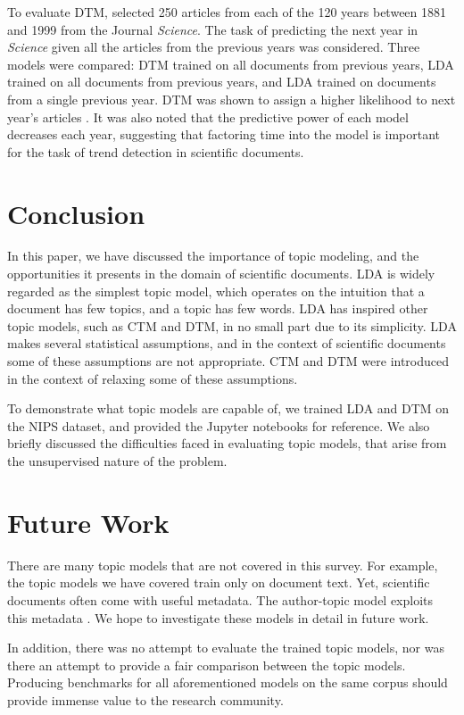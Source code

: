 \documentclass[letterpaper]{article}
\begin{document}
To evaluate DTM, \citeauthor{blei2006dynamic} selected 250 articles
from each of the 120 years between 1881 and 1999 from the Journal
\textit{Science}. The task of predicting the next year in
\textit{Science} given all the articles from the previous years was
considered. Three models were compared: DTM trained on all documents
from previous years, LDA trained on all documents from previous years,
and LDA trained on documents from a single previous year. DTM was
shown to assign a higher likelihood to next year's articles
\cite{blei2006dynamic}. It was also noted that the predictive power of
each model decreases each year, suggesting that factoring time into
the model is important for the task of trend detection in scientific
documents.

\section{Conclusion}
In this paper, we have discussed the importance of topic modeling, and
the opportunities it presents in the domain of scientific documents.
LDA is widely regarded as the simplest topic model, which operates on
the intuition that a document has few topics, and a topic has few
words. LDA has inspired other topic models, such as CTM and DTM, in no
small part due to its simplicity. LDA makes several statistical
assumptions, and in the context of scientific documents some of these
assumptions are not appropriate. CTM and DTM were introduced in
the context of relaxing some of these assumptions.

To demonstrate what topic models are capable of, we trained LDA and
DTM on the NIPS dataset, and provided the Jupyter notebooks for
reference. We also briefly discussed the difficulties faced in
evaluating topic models, that arise from the unsupervised nature of
the problem.

\section{Future Work}
There are many topic models that are not covered in this survey. For
example, the topic models we have covered train only on document text.
Yet, scientific documents often come with useful metadata. The
author-topic model exploits this metadata \cite{rosen2004author}. We
hope to investigate these models in detail in future work.

In addition, there was no attempt to evaluate the trained topic
models, nor was there an attempt to provide a fair comparison between
the topic models. Producing benchmarks for all aforementioned models
on the same corpus should provide immense value to the research
community.
\end{document}
